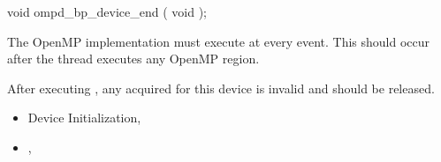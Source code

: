 \format
\begin{cspecific}
\begin{ompSyntax}
void ompd_bp_device_end ( void );
\end{ompSyntax}
\end{cspecific}


\descr

The OpenMP implementation must execute 
 at every  event.
This should occur after the thread executes any OpenMP region.

After 
executing , any  acquired for this
device is invalid and should be released.

\crossreferences
\begin{itemize}
\item
  Device Initialization, 
\item
  ,
\end{itemize}

